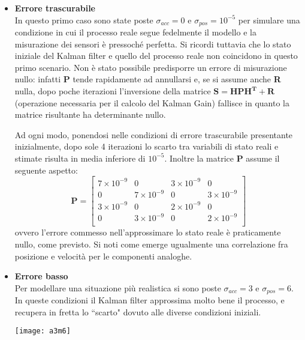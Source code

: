 \begin{itemize}
\item \textbf{Errore trascurabile}\\
In questo primo caso sono state poste $\sigma_{acc} = 0$ e $\sigma_{pos} = 10^{-5}$ per simulare una condizione in cui il processo reale segue fedelmente il modello e la misurazione dei sensori è pressoché perfetta. Si ricordi tuttavia che lo stato iniziale del Kalman filter e quello del processo reale non coincidono in questo primo scenario. Non è stato possibile predisporre un errore di misurazione nullo: infatti \textbf{P} tende rapidamente ad annullarsi e, se si assume anche \textbf{R} nulla, dopo poche iterazioni l'inversione della matrice $\mathbf{S = H P H^T + R}$  (operazione necessaria per il calcolo del Kalman Gain) fallisce in quanto la matrice risultante ha determinante nullo. 

Ad ogni modo, ponendosi nelle condizioni di errore trascurabile presentante inizialmente, dopo sole 4 iterazioni lo scarto tra variabili di stato reali e stimate risulta in media inferiore di $10^{-5}$. Inoltre la matrice \textbf{P} assume il seguente aspetto:
\begin{equation*}
\textbf{P} = 
\begin{bmatrix}
7 \times 10^{-9} & 0 & 3 \times 10^{-9} & 0 \\
0 & 7 \times 10^{-9} & 0 & 3 \times 10^{-9} \\
3 \times 10^{-9} & 0 & 2 \times 10^{-9} & 0 \\
0 & 3 \times 10^{-9} & 0 & 2 \times 10^{-9} \\
\end{bmatrix}
\end{equation*}
ovvero l'errore commesso nell'approssimare lo stato reale è praticamente nullo, come previsto. Si noti come emerge ugualmente una correlazione fra posizione e velocità per le componenti analoghe.

\item\textbf{Errore basso}\\
Per modellare una situazione più realistica si sono poste $\sigma_{acc} = 3$ e $\sigma_{pos} = 6$. In queste condizioni il Kalman filter approssima molto bene il processo, e recupera in fretta lo ``scarto" dovuto alle diverse condizioni iniziali.

\begin{minipage}{\linewidth}
	\centering
	\texttt{[image: a3m6]}
\end{minipage}


\end{itemize}
